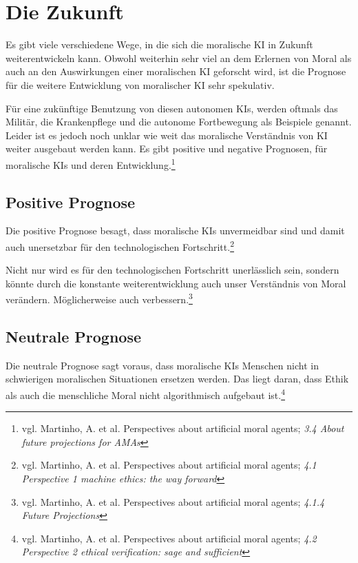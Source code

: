 \section{Die Zukunft}\label{sec::zukunft}

Es gibt viele verschiedene Wege, in die sich die moralische KI in Zukunft weiterentwickeln kann.
Obwohl weiterhin sehr viel an dem Erlernen von Moral als auch an den Auswirkungen einer
moralischen KI geforscht wird, ist die Prognose für die weitere Entwicklung von moralischer KI sehr spekulativ.

Für eine zukünftige Benutzung von diesen autonomen KIs, werden oftmals das Militär, die Krankenpflege
und die autonome Fortbewegung als Beispiele genannt. 
Leider ist es jedoch noch unklar wie weit das moralische Verständnis von KI weiter ausgebaut werden kann.
Es gibt positive und negative Prognosen, für moralische KIs und deren Entwicklung.\footnote{vgl. Martinho, A. et al. Perspectives about artificial moral agents; \textit{3.4 About future projections for AMAs}}

\subsection{Positive Prognose}\label{subsec::positive prognose}

Die positive Prognose besagt, dass moralische KIs unvermeidbar sind und damit auch
unersetzbar für den technologischen Fortschritt.\footnote{vgl. Martinho, A. et al. Perspectives about artificial moral agents; \textit{4.1 Perspective 1 machine ethics: the way forward}}

Nicht nur wird es für den technologischen Fortschritt unerlässlich sein, sondern könnte
durch die konstante weiterentwicklung auch unser Verständnis von Moral verändern.
Möglicherweise auch verbessern.\footnote{vgl. Martinho, A. et al. Perspectives about artificial moral agents; \textit{4.1.4 Future Projections}}

\subsection{Neutrale Prognose}\label{subsec::neutrale prognose}

Die neutrale Prognose sagt voraus, dass moralische KIs Menschen nicht in schwierigen moralischen
Situationen ersetzen werden.
Das liegt daran, dass Ethik als auch die menschliche Moral nicht algorithmisch aufgebaut ist.\footnote{vgl. Martinho, A. et al. Perspectives about artificial moral agents; \textit{4.2 Perspective 2 ethical verification: sage and sufficient}}

